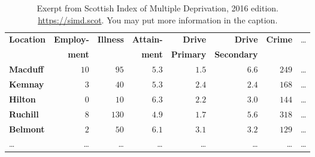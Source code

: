 \documentclass[11pt,a4paper]{article}
\begin{document}

\begin{table}[b]
  \caption{Exerpt from Scottish Index of Multiple Deprivation, 2016 edition.
    \url{https://simd.scot}. You may put more information in the caption.}
  \label{tab:example1}
\begin{tabular}{lrrrrrrr}
\hline\hline
\textbf{Location}&\textbf{Employ-}&\textbf{Illness}&\textbf{Attain-}&\textbf{Drive}  &\textbf{Drive}    &\textbf{Crime}&\dots\\
                 &\textbf{ment}   &                &\textbf{ment}   &\textbf{Primary}&\textbf{Secondary}&              &\\
\hline
\textbf{Macduff}&$10$&$ 95$&$5.3$&$1.5$&$6.6$&$249$&\dots\tabularnewline
\textbf{Kemnay}&$ 3$&$ 40$&$5.3$&$2.4$&$2.4$&$168$&\dots\tabularnewline
\textbf{Hilton}&$ 0$&$ 10$&$6.3$&$2.2$&$3.0$&$144$&\dots\tabularnewline
\textbf{Ruchill}&$ 8$&$130$&$4.9$&$1.7$&$5.6$&$318$&\dots\tabularnewline
\textbf{Belmont}&$ 2$&$ 50$&$6.1$&$3.1$&$3.2$&$129$&\dots\tabularnewline
\dots&\dots&\dots&\dots&\dots&\dots&\dots&\dots\tabularnewline
\hline
\end{tabular}
\end{table}

\end{document}
